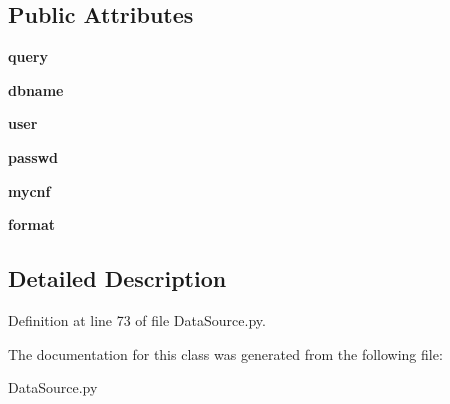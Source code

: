 \subsection*{Public Attributes}
\begin{DoxyCompactItemize}
\item 
\hypertarget{classDataSource_1_1DBaseSource_aee02199d2af33245fc9cc9741fb21f6e}{
{\bfseries query}}
\label{classDataSource_1_1DBaseSource_aee02199d2af33245fc9cc9741fb21f6e}

\item 
\hypertarget{classDataSource_1_1DBaseSource_ab0f88ad00efa0448a7f20b027c401a67}{
{\bfseries dbname}}
\label{classDataSource_1_1DBaseSource_ab0f88ad00efa0448a7f20b027c401a67}

\item 
\hypertarget{classDataSource_1_1DBaseSource_abeffcfbb2d7322f98a7ecbc0cf73db00}{
{\bfseries user}}
\label{classDataSource_1_1DBaseSource_abeffcfbb2d7322f98a7ecbc0cf73db00}

\item 
\hypertarget{classDataSource_1_1DBaseSource_ad9cb49eaabb02660c4840fc0d857becc}{
{\bfseries passwd}}
\label{classDataSource_1_1DBaseSource_ad9cb49eaabb02660c4840fc0d857becc}

\item 
\hypertarget{classDataSource_1_1DBaseSource_a98b07ec65665219f344450f9e8e94f74}{
{\bfseries mycnf}}
\label{classDataSource_1_1DBaseSource_a98b07ec65665219f344450f9e8e94f74}

\item 
\hypertarget{classDataSource_1_1DBaseSource_a06fa8663c0b689e1e657cbe52e73aabb}{
{\bfseries format}}
\label{classDataSource_1_1DBaseSource_a06fa8663c0b689e1e657cbe52e73aabb}

\end{DoxyCompactItemize}


\subsection{Detailed Description}


Definition at line 73 of file DataSource.py.

The documentation for this class was generated from the following file:\begin{DoxyCompactItemize}
\item 
DataSource.py\end{DoxyCompactItemize}

